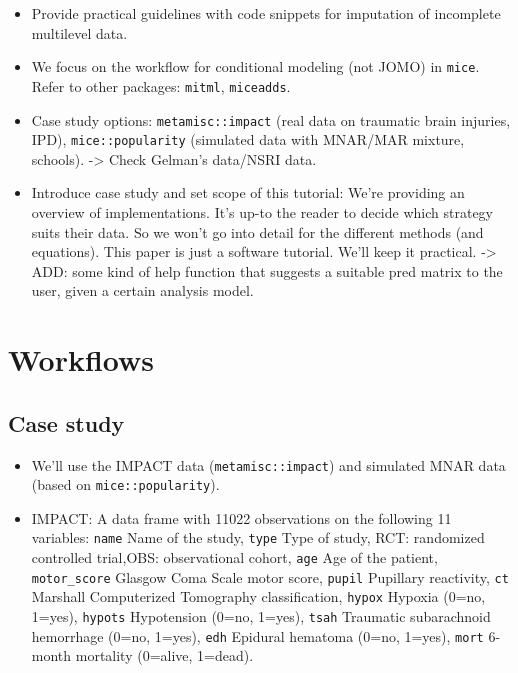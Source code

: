 \documentclass[
]{jss}
\begin{document}
\begin{itemize}
\item
  Provide practical guidelines with code snippets for imputation of
  incomplete multilevel data.
\item
  We focus on the workflow for conditional modeling (not JOMO) in
  \texttt{mice}. Refer to other packages: \texttt{mitml},
  \texttt{miceadds}.
\item
  Case study options: \texttt{metamisc::impact} (real data on traumatic
  brain injuries, IPD), \texttt{mice::popularity} (simulated data with
  MNAR/MAR mixture, schools). -\textgreater{} Check Gelman's data/NSRI
  data.
\item
  Introduce case study and set scope of this tutorial: We're providing
  an overview of implementations. It's up-to the reader to decide which
  strategy suits their data. So we won't go into detail for the
  different methods (and equations). This paper is just a software
  tutorial. We'll keep it practical. -\textgreater{} ADD: some kind of
  help function that suggests a suitable pred matrix to the user, given
  a certain analysis model.
\end{itemize}

\hypertarget{workflows}{%
\section{Workflows}\label{workflows}}

\hypertarget{case-study}{%
\subsection{Case study}\label{case-study}}

\begin{itemize}
\item
  We'll use the IMPACT data (\texttt{metamisc::impact}) and simulated
  MNAR data (based on \texttt{mice::popularity}).
\item
  IMPACT: A data frame with 11022 observations on the following 11
  variables: \texttt{name} Name of the study, \texttt{type} Type of
  study, RCT: randomized controlled trial,OBS: observational cohort,
  \texttt{age} Age of the patient, \texttt{motor\_score} Glasgow Coma
  Scale motor score, \texttt{pupil} Pupillary reactivity, \texttt{ct}
  Marshall Computerized Tomography classification, \texttt{hypox}
  Hypoxia (0=no, 1=yes), \texttt{hypots} Hypotension (0=no, 1=yes),
  \texttt{tsah} Traumatic subarachnoid hemorrhage (0=no, 1=yes),
  \texttt{edh} Epidural hematoma (0=no, 1=yes), \texttt{mort} 6-month
  mortality (0=alive, 1=dead).
\end{itemize}
\end{document}
